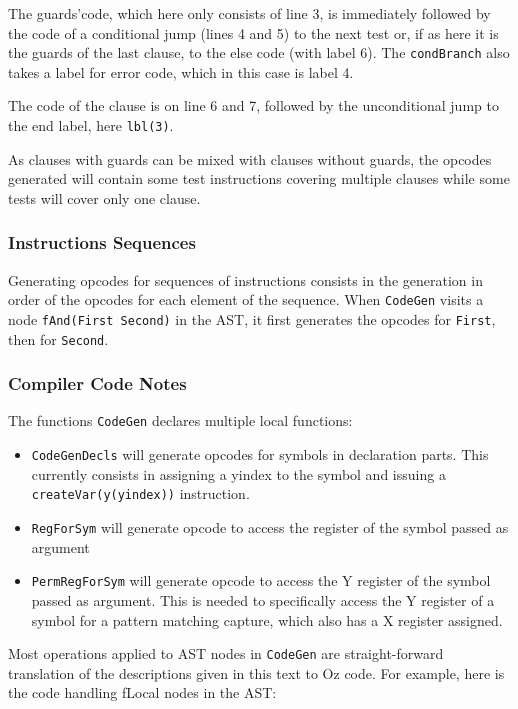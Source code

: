 \documentclass[a4paper]{memoir}
\begin{document}
The guards'code, which here only consists of line 3, is immediately
followed by the code of a conditional jump (lines 4 and 5) to the next test or, if as here it is the guards
of the last clause, to the else code (with label 6). The \lstinline!condBranch!
also takes a label for error code, which in this case is label 4.

The code of the clause is on line 6 and 7, followed by the unconditional jump to
the end label, here \lstinline!lbl(3)!.

As clauses with guards can be mixed with clauses without guards, the opcodes
generated will contain some test instructions covering multiple clauses while
some tests will cover only one clause.

\subsubsection{Instructions Sequences}
Generating opcodes for sequences of instructions consists in the generation in order of the opcodes for each element of the sequence. 
When \lstinline!CodeGen! visits a node \lstinline!fAnd(First Second)! in the AST, it first generates the opcodes for \lstinline!First!, then for \lstinline!Second!.


\subsubsection{Compiler Code Notes}
The functions \lstinline!CodeGen! declares multiple local functions:
\begin{itemize}
  \item \lstinline!CodeGenDecls! will generate opcodes for symbols in
    declaration parts. This currently consists in assigning a yindex to the
    symbol and issuing a \lstinline!createVar(y(yindex))! instruction.
  \item \lstinline!RegForSym! will generate opcode to access the register of the
    symbol passed as argument
  \item \lstinline!PermRegForSym! will generate opcode to access the Y register
    of the symbol passed as argument. This is needed to specifically access the
    Y register of a symbol for a pattern matching capture, which also has a X
    register assigned.
\end{itemize}

Most operations applied to AST nodes in \lstinline!CodeGen! are straight-forward translation of the
descriptions given in this text to Oz code. For example, here is the
code handling fLocal nodes in the AST:
\end{document}
